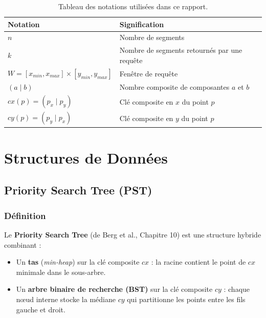 \documentclass[11pt,a4paper]{article}
\begin{document}
\begin{table}[h]
\centering
\begin{tabular}{@{}ll@{}}
\toprule
\textbf{Notation} & \textbf{Signification} \\
\midrule
$n$ & Nombre de segments \\
$k$ & Nombre de segments retournés par une requête \\
$W = [x_{min}, x_{max}] \times [y_{min}, y_{max}]$ & Fenêtre de requête \\
$(a \mid b)$ & Nombre composite de composantes $a$ et $b$ \\
$cx(p) = (p_x \mid p_y)$ & Clé composite en $x$ du point $p$ \\
$cy(p) = (p_y \mid p_x)$ & Clé composite en $y$ du point $p$ \\
\bottomrule
\end{tabular}
\caption{Tableau des notations utilisées dans ce rapport.}
\end{table}

\section{Structures de Données}

\subsection{Priority Search Tree (PST)}

\subsubsection{Définition}

Le \textbf{Priority Search Tree} (de Berg et al., Chapitre 10) est une structure hybride combinant :
\begin{itemize}
    \item Un \textbf{tas} (\textit{min-heap}) sur la clé composite $cx$ : la racine contient le point de $cx$ minimale dans le sous-arbre.
    \item Un \textbf{arbre binaire de recherche (BST)} sur la clé composite $cy$ : chaque nœud interne stocke la médiane $cy$ qui partitionne les points entre les fils gauche et droit.
\end{itemize}
\end{document}
